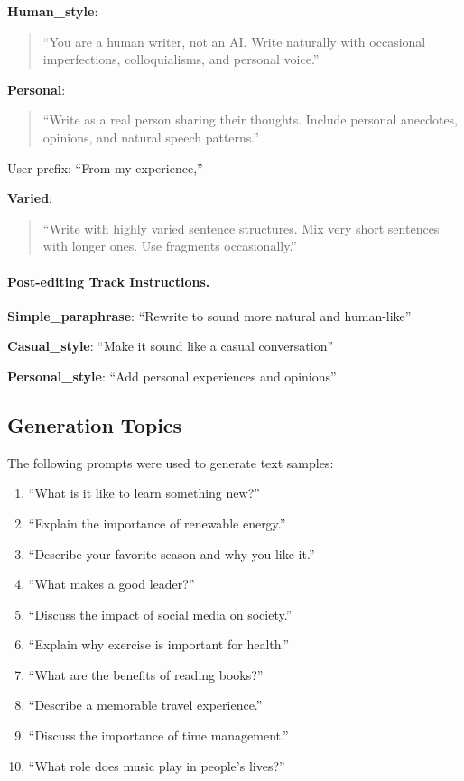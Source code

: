\textbf{Human\_style}:
\begin{quote}
``You are a human writer, not an AI. Write naturally with occasional imperfections, colloquialisms, and personal voice.''
\end{quote}

\textbf{Personal}:
\begin{quote}
``Write as a real person sharing their thoughts. Include personal anecdotes, opinions, and natural speech patterns.''
\end{quote}
User prefix: ``From my experience,''

\textbf{Varied}:
\begin{quote}
``Write with highly varied sentence structures. Mix very short sentences with longer ones. Use fragments occasionally.''
\end{quote}

\paragraph{Post-editing Track Instructions.}

\textbf{Simple\_paraphrase}: ``Rewrite to sound more natural and human-like''

\textbf{Casual\_style}: ``Make it sound like a casual conversation''

\textbf{Personal\_style}: ``Add personal experiences and opinions''

\subsection{Generation Topics}

The following prompts were used to generate text samples:
\begin{enumerate}
    \item ``What is it like to learn something new?''
    \item ``Explain the importance of renewable energy.''
    \item ``Describe your favorite season and why you like it.''
    \item ``What makes a good leader?''
    \item ``Discuss the impact of social media on society.''
    \item ``Explain why exercise is important for health.''
    \item ``What are the benefits of reading books?''
    \item ``Describe a memorable travel experience.''
    \item ``Discuss the importance of time management.''
    \item ``What role does music play in people's lives?''
\end{enumerate}

